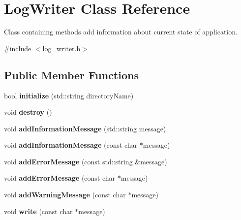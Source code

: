 \hypertarget{class_log_writer}{}\section{Log\+Writer Class Reference}
\label{class_log_writer}


Class containing methods add information about current state of application.  




{\ttfamily \#include $<$log\+\_\+writer.\+h$>$}

\subsection*{Public Member Functions}
\begin{DoxyCompactItemize}
\item 
\mbox{\label{class_log_writer_a1cedcc7f343d59239d4c9f366418d44e}} 
bool {\bfseries initialize} (std\+::string directory\+Name)
\item 
\mbox{\label{class_log_writer_a42c6726ace5a0b60311978edd9303a3f}} 
void {\bfseries destroy} ()
\item 
\mbox{\label{class_log_writer_a1ce4389bff086f329383741f066f877a}} 
void {\bfseries add\+Information\+Message} (std\+::string message)
\item 
\mbox{\label{class_log_writer_afe4e4ca6202ee9794d78dce5dad3af79}} 
void {\bfseries add\+Information\+Message} (const char $\ast$message)
\item 
\mbox{\label{class_log_writer_aa4ac503f2f74bd35f5b626f134f9315a}} 
void {\bfseries add\+Error\+Message} (const std\+::string \&message)
\item 
\mbox{\label{class_log_writer_a42b4eddd43eef58d97b87580fed2b85e}} 
void {\bfseries add\+Error\+Message} (const char $\ast$message)
\item 
\mbox{\label{class_log_writer_a7d23476cc15635eb47f0edd9f9b74a3f}} 
void {\bfseries add\+Warning\+Message} (const char $\ast$message)
\item 
\mbox{\label{class_log_writer_a39801f380662e1bb771e1f8ee991beac}} 
void {\bfseries write} (const char $\ast$message)
\end{DoxyCompactItemize}
